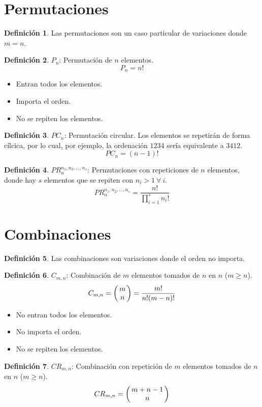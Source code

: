 \documentclass[10pt,a4paper]{article}
\theoremstyle{definition}
\newtheorem{definition}{Definición}[section]
\begin{document}
\section{Permutaciones}
\begin{definition}
Las permutaciones son un caso particular de variaciones donde $m=n$.
\end{definition}
\begin{definition}
$P_n$: Permutación de $n$ elementos.
\[P_n = n!\]
\begin{itemize}
	\item Entran todos los elementos.
	\item Importa el orden.
	\item No se repiten los elementos.
	\end{itemize}
\end{definition}
\begin{definition}
	$PC_n$: Permutación circular. Los elementos se repetirán de forma cílcica, por lo cual, por ejemplo, la ordenación $1234$ sería equivalente a $3412$.
	\[PC_n = (n-1)!\]
\end{definition}
\begin{definition}
	$PR_n^{n_1,n_2,\dots,n_s}$: Permutaciones con repeticiones de $n$ elementos, donde hay $s$ elementos que se repiten con $n_i>1\:\forall\:i$.
	\[PR_n^{n_1,n_2,\dots,n_s}=\frac{n!}{\prod_{i=1}^s n_i!}\]
\end{definition}
\section{Combinaciones}
\begin{definition}
Las combinaciones son variaciones donde el orden no importa.
\end{definition}
\begin{definition}
	$C_{m,n}$: Combinación de $m$ elementos tomados de $n$ en $n$ ($m\geq n$).
	\[C_{m,n} = \arraycolsep=1.4pt\left(\begin{array}{c}
	m\\n
\end{array}\right) = \frac{m!}{n!(m-n)!}
\]
\begin{itemize}
	\item No entran todos los elementos.
	\item No importa el orden.
	\item No se repiten los elementos.
\end{itemize}
\end{definition}
\begin{definition}
	$CR_{m,n}$: Combinación con repetición de $m$ elementos tomados de $n$ en $n$ ($m\geq n$).
	\[CR_{m,n} = \arraycolsep=1.4pt\left(\begin{array}{c}m+n-1\\n\end{array}\right)\]

\end{definition}
\end{document}
